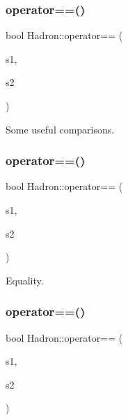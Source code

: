 \subsubsection{\texorpdfstring{operator==()}{operator==()}\hspace{0.1cm}{\footnotesize\ttfamily [1/5]}}
{\footnotesize\ttfamily bool Hadron\+::operator== (\begin{DoxyParamCaption}\item[{const \mbox{\hyperlink{structHadron_1_1QuarkNum__t}{Quark\+Num\+\_\+t}} \&}]{s1,  }\item[{const \mbox{\hyperlink{structHadron_1_1QuarkNum__t}{Quark\+Num\+\_\+t}} \&}]{s2 }\end{DoxyParamCaption})}



Some useful comparisons. 

\mbox{\label{namespaceHadron_a89bb389d765cff67405fdb2d27b9b289}} 
\subsubsection{\texorpdfstring{operator==()}{operator==()}\hspace{0.1cm}{\footnotesize\ttfamily [2/5]}}
{\footnotesize\ttfamily bool Hadron\+::operator== (\begin{DoxyParamCaption}\item[{const \mbox{\hyperlink{structHadron_1_1HadronAdjMapTarget__t}{Hadron\+Adj\+Map\+Target\+\_\+t}} \&}]{s1,  }\item[{const \mbox{\hyperlink{structHadron_1_1HadronAdjMapTarget__t}{Hadron\+Adj\+Map\+Target\+\_\+t}} \&}]{s2 }\end{DoxyParamCaption})}



Equality. 

\mbox{\label{namespaceHadron_ac884c28242a0aaf83a23169ef8ff5b2b}} 
\subsubsection{\texorpdfstring{operator==()}{operator==()}\hspace{0.1cm}{\footnotesize\ttfamily [3/5]}}
{\footnotesize\ttfamily bool Hadron\+::operator== (\begin{DoxyParamCaption}\item[{const \mbox{\hyperlink{structHadron_1_1KeyHadronNPartNPtConnGraph__t}{Key\+Hadron\+N\+Part\+N\+Pt\+Conn\+Graph\+\_\+t}} \&}]{s1,  }\item[{const \mbox{\hyperlink{structHadron_1_1KeyHadronNPartNPtConnGraph__t}{Key\+Hadron\+N\+Part\+N\+Pt\+Conn\+Graph\+\_\+t}} \&}]{s2 }\end{DoxyParamCaption})}



